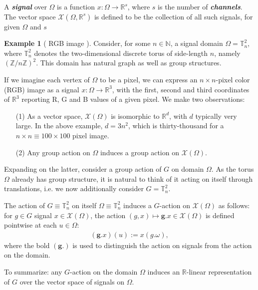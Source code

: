 \documentclass[12pt]{article}
\numberwithin{equation}{section}
\theoremstyle{definition}
\newtheorem{eg}{Example}
\newcommand{		\N		}	{	\mathbb{N}				}
\newcommand{		\R		}	{	\mathbb{R}				}
\newcommand{		\Z		}	{	\mathbb{Z}				}
\newcommand{		\cX		}	{	\mathcal{X}				}
\newcommand{		\eq		}[1]	{	\begin{align*}#1\end{align*}	}%
\newcommand{		\B		}	{\textbf					} %
\newcommand{		\Oh		}	{	\Omega					}
\newcommand{		\1		}	{	\bm{1}					}%
\begin{document}
A \emph{\B{signal}} over $\Oh$ is a function $x : \Oh \to \R^s$, where $s$ is the number of \emph{\B{channels}}. The vector space $\cX(\Oh,\R^s)$ is defined to be the collection of all such signals, for given $\Oh$ and $s$

\vspace{5mm}

\begin{mdframed}
\begin{eg}[ RGB image ] 
Consider, for some $n \in \N$, a signal domain $\Oh = \mathbb{T}_n^2$, where $\mathbb{T}_n^2$ denotes the two-dimensional discrete torus of side-length $n$, namely $( \Z / n\Z )^2$. This domain has natural graph as well as group structures. 

If we imagine each vertex of $\Oh$ to be a pixel, we can express an $n \times n$-pixel color (RGB) image as a signal $x : \Oh \to \R^3$, with the first, second and third coordinates of $\R^3$ reporting R, G and B values of a given pixel. We make two observations: 
\begin{itemize}
\item[(1)] As a vector space, $\mathcal{X}(\Omega)$ is isomorphic to $\mathbb{R}^d$, with $d$ typically very large. In the above example, $d = 3n^2$, which is thirty-thousand for a $n \times n \equiv 100 \times 100$ pixel image. 
\item[(2)] Any group action on $\Omega$ induces a group action on $\mathcal{X}(\Omega)$. 
\end{itemize}

Expanding on the latter, consider a group action of $G$ on domain $\Omega$. As the torus $\Oh$ already has group structure, it is natural to think of it acting on itself through translations, i.e. we now additionally consider $G = \mathbb{T}_n^2$. 

The action of $G \equiv \mathbb{T}_n^2$ on itself $\Oh \equiv \mathbb{T}_n^2$ induces a $G$-action on $\mathcal{X}(\Omega)$ as follows: for $g \in G$ signal $x \in \mathcal{X}(\Omega)$, the action $(g, x) \mapsto \bm{g}.x \in \mathcal{X}(\Omega)$  is defined pointwise at each $u \in \Omega$:
\eq{
(\bm{g}.x)(u) := x(g.\omega),
}
where the bold $(\bm{g}.)$ is used to distinguish the action on signals from the action on the domain. 

\end{eg}
\end{mdframed}

\vspace{5mm}

To summarize: any $G$-action on the domain $\Omega$ induces an $\mathbb{R}$-linear representation of $G$ over the vector space of signals on $\Omega$.
\end{document}
